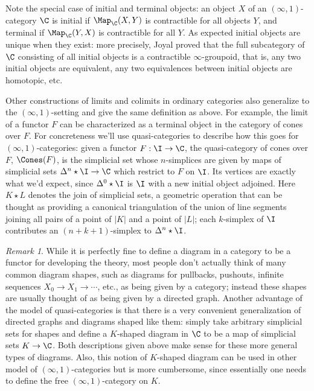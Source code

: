 \documentclass{conm-p-l}
\theoremstyle{definition} \newtheorem{definition}[theorem]{Definition}
\theoremstyle{remark} \newtheorem{remark}[theorem]{Remark}
\numberwithin{equation}{section}
\newcommand{\oo}{\infty}
\newcommand{\io}{$(\oo,1)$}
\newcommand{\abs}[1]{\left|#1\right|}
\begin{document}
Note the special case of initial and terminal objects: an object $X$ of
an \io-category $\C$ is initial if $\Map_\C(X,Y)$ is contractible for all
objects $Y$, and terminal if $\Map_\C(Y,X)$ is contractible for all
$Y$. As expected initial objects are unique when they exist: more
precisely, Joyal proved that the full subcategory of $\C$ consisting
of all initial objects is a contractible $\oo$-groupoid, that is, any
two initial objects are equivalent, any two equivalences between
initial objects are homotopic, etc.

Other constructions of limits and colimits in ordinary categories also
generalize to the \io-setting and give the same definition as above.
For example, the limit of a functor $F$ can be characterized as a
terminal object in the category of cones over $F$. For concreteness
we'll use quasi-categories to describe how this goes for
\io-categories: given a functor $F : \I \to \C$, the quasi-category of
cones over $F$, $\Cones(F)$, is the simplicial set whose $n$-simplices
are given by maps of simplicial sets $\Delta^n \star \I \to \C$ which
restrict to $F$ on $\I$. Its vertices are exactly what we'd expect,
since $\Delta^0 \star \I$ is $\I$ with a new initial object adjoined.
Here $K \star L$ denotes the join of simplicial sets, a geometric
operation that can be thought as providing a canonical triangulation
of the union of line segments joining all pairs of a point of $\abs{K}$
and a point of $\abs{L}$; each $k$-simplex of $\I$ contributes an
$(n+k+1)$-simplex to $\Delta^n \star \I$.

\begin{remark}
  While it is perfectly fine to define a diagram in a category to be a
  functor for developing the theory, most people don't actually think
  of many common diagram shapes, such as diagrams for pullbacks,
  pushouts, infinite sequences $X_0 \to X_1 \to \cdots$, etc., as
  being given by a category; instead these shapes are usually thought
  of as being given by a directed graph. Another advantage of the
  model of quasi-categories is that there is a very convenient
  generalization of directed graphs and diagrams shaped like them:
  simply take arbitrary simplicial sets for shapes and define a
  $K$-shaped diagram in $\C$ to be a map of simplicial sets $K \to
  \C$. Both descriptions given above make sense for these more general
  types of diagrams. Also, this notion of $K$-shaped diagram can be
  used in other model of \io-categories but is more cumbersome, since
  essentially one needs to define the free \io-category on $K$.
\end{remark}
\end{document}
